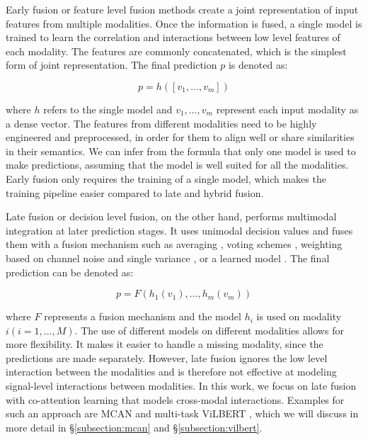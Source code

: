 \documentclass{article}
\begin{document}
Early fusion or feature level fusion methods create a joint representation of input features from multiple modalities. Once the information is fused, a single model is trained to learn the correlation and interactions between low level features of each modality. The features are commonly concatenated, which is the simplest form of joint representation. The final prediction $p$ is denoted as:

\begin{equation}
p = h([v_1, \dots , v_m])
\end{equation}

where $h$ refers to the single model and $ v_1, \dots , v_m$ represent each input modality as a dense vector. The features from different modalities need to be highly engineered and preprocessed, in order for them to align well or share similarities in their semantics. We can infer from the formula that only one model is used to make predictions, assuming that the model is well suited for all the modalities. Early fusion only requires the training of a single model, which makes the training pipeline easier compared to late and hybrid fusion.

Late fusion or decision level fusion, on the other hand, performs multimodal integration at later prediction stages. It uses unimodal decision values and fuses them with a fusion mechanism such as averaging \citep{shutova2016black}, voting schemes \citep{morvant2014vote}, weighting based on channel noise \citep{potamianos2003noise} and single variance \citep{evangelopoulos2013variance}, or a learned model \citep{glodek2011learned, ramirez2011learned}. The final prediction can be denoted as:

\begin{equation}
p = F(h_1(v_1), \dots , h_m(v_m))
\end{equation}

where $F$ represents a fusion mechanism and the model $h_i$ is used on modality $ i (i = 1, \dots , M)$. The use of different models on different modalities allows for more flexibility. It makes it easier to handle a missing modality, since the predictions are made separately. However, late fusion ignores the low level interaction between the modalities and is therefore not effective at modeling signal-level interactions between modalities. In this work, we focus on late fusion with co-attention learning that models cross-modal interactions. Examples for such an approach are MCAN \citep{yu2019mcan} and multi-task ViLBERT \citep{lu2020multitask}, which we will discuss in more detail in \S \ref{subsection:mcan} and \S \ref{subsection:vilbert}.
\end{document}

